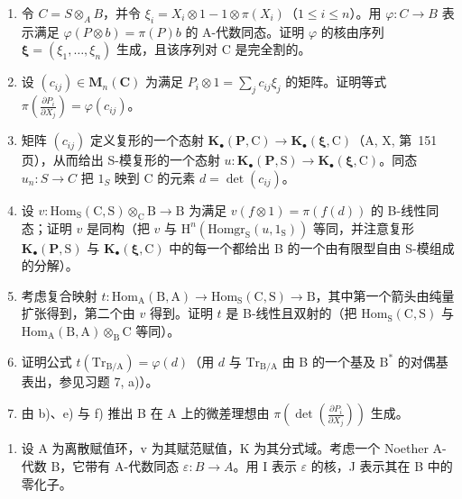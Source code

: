 \begin{enumerate}
\def\labelenumi{\alph{enumi})}
\item
  令 \(C = S \otimes_{A} B\)，并令 \(\xi_{i} = X_{i} \otimes 1 - 1 \otimes \pi(X_{i})\)（\(1 \leqslant i \leqslant n\)）。用 \(\varphi : C \to B\) 表示满足 \(\varphi(P \otimes b) = \pi(P)b\) 的 A-代数同态。证明 \(\varphi\) 的核由序列 \(\boldsymbol{\xi} = (\xi_{1}, \ldots, \xi_{n})\) 生成，且该序列对 C 是完全割的。
\item
  设 \((c_{ij}) \in \mathbf{M}_{n}(\mathbf{C})\) 为满足 \(P_{i} \otimes 1 = \sum_{j} c_{ij} \xi_{j}\) 的矩阵。证明等式 \(\pi(\frac{\partial P_{i}}{\partial X_{j}}) = \varphi(c_{ij})\)。
\item
  矩阵 \((c_{ij})\) 定义复形的一个态射 \(\mathbf{K}_{\bullet}(\mathbf{P},\mathrm{C})\to\mathbf{K}_{\bullet}(\boldsymbol{\xi},\mathrm{C})\)（A, X, 第~151 页），从而给出 S-模复形的一个态射 \(u:\mathbf{K}_{\bullet}(\mathbf{P},\mathrm{S})\to\mathbf{K}_{\bullet}(\boldsymbol{\xi},\mathrm{C})\)。同态 \(u_{n}:S\to C\) 把 \(1_{S}\) 映到 C 的元素 \(d=\det(c_{ij})\)。
\item
  设 \(v: \mathrm{Hom}_{\mathrm{S}}(\mathrm{C}, \mathrm{S}) \otimes_{\mathrm{C}} \mathrm{B} \to \mathrm{B}\) 为满足 \(v(f \otimes 1) = \pi(f(d))\) 的 B-线性同态；证明 \(v\) 是同构（把 \(v\) 与 \(\mathrm{H}^n(\mathrm{Homgr}_{\mathrm{S}}(u, 1_{\mathrm{S}}))\) 等同，并注意复形 \(\mathbf{K}_{\bullet}(\mathbf{P}, \mathrm{S})\) 与 \(\mathbf{K}_{\bullet}(\boldsymbol{\xi}, \mathrm{C})\) 中的每一个都给出 B 的一个由有限型自由 S-模组成的分解）。

\item
  考虑复合映射 \(t: \mathrm{Hom}_{\mathrm{A}}(\mathrm{B}, \mathrm{A}) \to \mathrm{Hom}_{\mathrm{S}}(\mathrm{C}, \mathrm{S}) \to \mathrm{B}\)，其中第一个箭头由纯量扩张得到，第二个由 \(v\) 得到。证明 \(t\) 是 B-线性且双射的（把 \(\mathrm{Hom}_{\mathrm{S}}(\mathrm{C}, \mathrm{S})\) 与 \(\mathrm{Hom}_{\mathrm{A}}(\mathrm{B}, \mathrm{A}) \otimes_{\mathrm{B}} \mathrm{C}\) 等同）。
\item
  证明公式 \(t(\mathrm{Tr}_{\mathrm{B / A}}) = \varphi (d)\)（用 \(d\) 与 \(\mathrm{Tr}_{\mathrm{B / A}}\) 由 B 的一个基及 \(\mathrm{B}^*\) 的对偶基表出，参见习题 7, a)）。
\item
  由 b)、e) 与 f) 推出 B 在 A 上的微差理想由 \(\pi(\det(\frac{\partial P_i}{\partial X_j}))\) 生成。
\end{enumerate}

\begin{enumerate}
\def\labelenumi{\arabic{enumi})}
\setcounter{enumi}{9}
\tightlist
\item
  设 A 为离散赋值环，v 为其赋范赋值，K 为其分式域。考虑一个 Noether A-代数 B，它带有 A-代数同态 \(\varepsilon:B\to A\)。用 I 表示 \(\varepsilon\) 的核，J 表示其在 B 中的零化子。
\end{enumerate}

